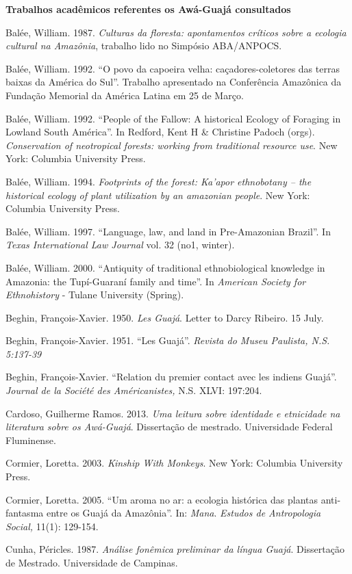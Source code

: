 \textbf{Trabalhos acadêmicos referentes os Awá-Guajá consultados }

Balée, William. 1987. \emph{Culturas da floresta: apontamentos críticos
sobre a ecologia cultural na Amazônia}, trabalho lido no Simpósio
ABA/ANPOCS.

Balée, William. 1992. ``O povo da capoeira velha: caçadores-coletores
das terras baixas da América do Sul''. Trabalho apresentado na
Conferência Amazônica da Fundação Memorial da América Latina em 25 de
Março.

Balée, William. 1992. ``People of the Fallow: A historical Ecology of
Foraging in Lowland South América''. In Redford, Kent H \& Christine
Padoch (orgs). \emph{Conservation of neotropical forests: working from
traditional resource use}. New York: Columbia University Press.

Balée, William. 1994. \emph{Footprints of the forest: Ka'apor
ethnobotany -- the historical ecology of plant utilization by an
amazonian people}. New York: Columbia University Press.

Balée, William. 1997. ``Language, law, and land in Pre-Amazonian
Brazil''. In \emph{Texas International Law Journal} vol. 32 (no1,
winter).

Balée, William. 2000. ``Antiquity of traditional ethnobiological
knowledge in Amazonia: the Tupí-Guaraní family and time''. In
\emph{American Society for Ethnohistory} - Tulane University (Spring).

Beghin, François-Xavier. 1950. \emph{Les Guajá}. Letter to Darcy
Ribeiro. 15 July.

Beghin, François-Xavier. 1951. ``Les Guajá''. \emph{Revista do Museu
Paulista, N.S. 5:137-39}

Beghin, François-Xavier. ``Relation du premier contact avec les indiens
Guajá''. \emph{Journal de la Société des Américanistes,} N.S. XLVI:
197:204.

Cardoso, Guilherme Ramos. 2013. \emph{Uma leitura sobre identidade e
etnicidade na literatura sobre os Awá-Guajá}. Dissertação de mestrado.
Universidade Federal Fluminense.

Cormier, Loretta. 2003. \emph{Kinship With Monkeys}. New York: Columbia
University Press.

Cormier, Loretta. 2005. ``Um aroma no ar: a ecologia histórica das
plantas anti-fantasma entre os Guajá da Amazônia''. In: \emph{Mana}.
\emph{Estudos de Antropologia Social,} 11(1): 129-154.

Cunha, Péricles. 1987. \emph{Análise fonêmica preliminar da língua
Guajá}. Dissertação de Mestrado. Universidade de Campinas.

